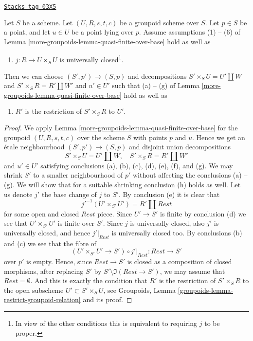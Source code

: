 \begin{lemma}
\label{more-groupoids-lemma-quasi-finite-over-base-j-proper}
\href{https://stacks.math.columbia.edu/tag/03X5}{\texttt{Stacks tag 03X5}}

Let $S$ be a scheme.
Let $(U, R, s, t, c)$ be a groupoid scheme over $S$.
Let $p \in S$ be a point, and let $u \in U$ be a point lying over $p$.
Assume assumptions (1) -- (6) of
Lemma \ref{more-groupoids-lemma-quasi-finite-over-base}
hold as well as
\begin{enumerate}
\item[(7)] $j : R \to U \times_S U$ is universally closed\footnote{In view of
the other conditions this is equivalent to requiring $j$ to be proper.}.
\end{enumerate}
Then we can choose $(S', p') \to (S, p)$ and decompositions
$S' \times_S U = U' \amalg W$ and $S' \times_S R = R' \amalg W'$
and $u' \in U'$ such that (a) -- (g) of
Lemma \ref{more-groupoids-lemma-quasi-finite-over-base}
hold as well as
\begin{enumerate}
\item[(h)] $R'$ is the restriction of $S' \times_S R$ to $U'$.
\end{enumerate}
\end{lemma}

\begin{proof}
We apply Lemma \ref{more-groupoids-lemma-quasi-finite-over-base} for the
groupoid $(U, R, s, t, c)$ over the scheme $S$ with points $p$ and $u$.
Hence we get an \'etale neighbourhood
$(S', p') \to (S, p)$ and disjoint union decompositions
$$
S' \times_S U = U' \amalg W, \quad
S' \times_S R = R' \amalg W'
$$
and $u' \in U'$ satisfying conclusions (a), (b), (c), (d), (e), (f), and (g).
We may shrink $S'$ to a smaller neighbourhood of $p'$ without
affecting the conclusions (a) -- (g). We will show that for a suitable
shrinking conclusion (h) holds as well.
Let us denote $j'$ the base change of $j$ to $S'$.
By conclusion (e) it is clear that
$$
j'^{-1}(U' \times_{S'} U') = R' \amalg Rest
$$
for some open and closed $Rest$ piece. Since $U' \to S'$ is finite
by conclusion (d) we see that $U' \times_{S'} U'$ is finite over $S'$.
Since $j$ is universally closed, also $j'$ is universally closed, and
hence $j'|_{Rest}$ is universally closed too. By conclusions
(b) and (c) we see that the fibre of
$$
(U' \times_{S'} U' \to S') \circ j'|_{Rest} :
Rest
\longrightarrow
S'
$$
over $p'$ is empty. Hence, since $Rest \to S'$ is closed as a composition
of closed morphisms, after replacing $S'$ by
$S' \setminus \Im(Rest \to S')$, we may assume that
$Rest = \emptyset$. And this is exactly the condition that $R'$ is
the restriction of $S' \times_S R$ to the open subscheme
$U' \subset S' \times_S U$, see
Groupoids, Lemma \ref{groupoids-lemma-restrict-groupoid-relation}
and its proof.
\end{proof}

